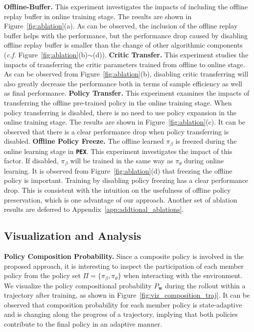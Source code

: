 \documentclass{article}
\newcommand{\w}{{\mathbf{w}}}
\newcommand{\alg}[1]{\textbf{\texttt{#1}}}
\begin{document}
\vspace{-0.1in}
{\flushleft\textbf{Offline-Buffer.}} This experiment investigates the impacts of including the
offline replay buffer in online training stage. The results are shown in Figure~\ref{fig:ablation}(a).
As can be observed, the inclusion of the offline replay buffer helps with the performance, but the performance drop
caused by disabling offline replay buffer is smaller than the change of other algorithmic components (\emph{c.f.} Figure~\ref{fig:ablation}(b)$\sim$(d)).
\vspace{-0.05in}
{\flushleft\textbf{Critic Transfer.}} This experiment studies the impacts of transferring the critic parameters trained
from offline  to online stage. As can be observed from Figure~\ref{fig:ablation}(b), disabling
critic transferring will also greatly decrease the performance both in terms of sample efficiency as well as final
performance.
\vspace{-0.2in}
{\flushleft\textbf{Policy Transfer.}}
This experiment examines the impacts of transferring the offline pre-trained policy in the online training stage.
When policy transferring is disabled, there is no need to use policy expansion in the online training stage.
The results are shown in Figure~\ref{fig:ablation}(c).
It can be observed that there is a clear performance drop when policy transferring is disabled.
\vspace{-0.1in}
{\flushleft\textbf{Offline Policy Freeze.}}  The offline learned $\pi_{\beta}$ is freezed during the online learning stage in \alg{PEX}. This experiment investigates the impact of this factor.
If disabled, $\pi_{\beta}$ will be trained in the same way as $\pi_{\theta}$ during online learning. It is observed from  Figure~\ref{fig:ablation}(d) that freezing the offline policy is important. Training by disabling policy freezing has a clear performance drop. This is consistent with the intuition on the usefulness of offline policy preservation, which is one advantage of our approach.
Another set of ablation results are deferred to Appendix~\ref{app:addtional_ablations}.



 \vspace{-0.1in}
\subsection{Visualization and Analysis}
 \vspace{-0.05in}

\textbf{Policy Composition Probability.}
Since a composite policy is involved in the proposed approach, it is interesting to
inspect the participation of each member policy from the policy set $\Pi\!=\!\{\pi_{\beta}, \pi_{\theta}\}$ when interacting with the
environment.
We visualize the policy compositional probability $P_{\w}$ during the rollout within a trajectory after training, as shown in Figure~\ref{fig:viz_composition_traj}.
It can be observed that composition probability for each member policy is state-adaptive
and is changing along the progress of a trajectory, implying that both policies contribute to the final policy in an adaptive manner.
\end{document}
